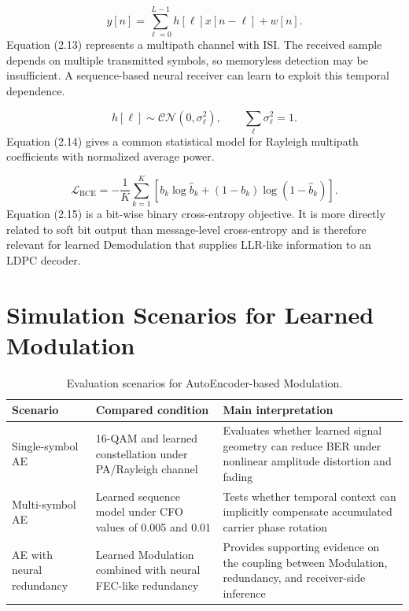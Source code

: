 \begin{equation}
y[n]=\sum_{\ell=0}^{L-1}h[\ell]x[n-\ell]+w[n].
\end{equation}
Equation (2.13) represents a multipath channel with ISI. The received sample depends on multiple transmitted symbols, so memoryless detection may be insufficient. A sequence-based neural receiver can learn to exploit this temporal dependence.

\begin{equation}
h[\ell]\sim\mathcal{CN}(0,\sigma_{\ell}^{2}),\qquad \sum_{\ell}\sigma_{\ell}^{2}=1.
\end{equation}
Equation (2.14) gives a common statistical model for Rayleigh multipath coefficients with normalized average power.

\begin{equation}
\mathcal{L}_{\mathrm{BCE}}=-\frac{1}{K}\sum_{k=1}^{K}\left[b_k\log \hat{b}_k+(1-b_k)\log(1-\hat{b}_k)\right].
\end{equation}
Equation (2.15) is a bit-wise binary cross-entropy objective. It is more directly related to soft bit output than message-level cross-entropy and is therefore relevant for learned Demodulation that supplies LLR-like information to an LDPC decoder.

\section{Simulation Scenarios for Learned Modulation}
\begin{table}[H]
\centering
\caption{Evaluation scenarios for AutoEncoder-based Modulation.}
\label{tab:ae_modulation_scenarios}
\begin{tabularx}{\textwidth}{p{}p{}Y}
\toprule
Scenario & Compared condition & Main interpretation\\
\midrule
Single-symbol AE & 16-QAM and learned constellation under PA/Rayleigh channel & Evaluates whether learned signal geometry can reduce BER under nonlinear amplitude distortion and fading\\
Multi-symbol AE & Learned sequence model under CFO values of 0.005 and 0.01 & Tests whether temporal context can implicitly compensate accumulated carrier phase rotation\\
AE with neural redundancy & Learned Modulation combined with neural FEC-like redundancy & Provides supporting evidence on the coupling between Modulation, redundancy, and receiver-side inference\\
\bottomrule
\end{tabularx}
\end{table}

